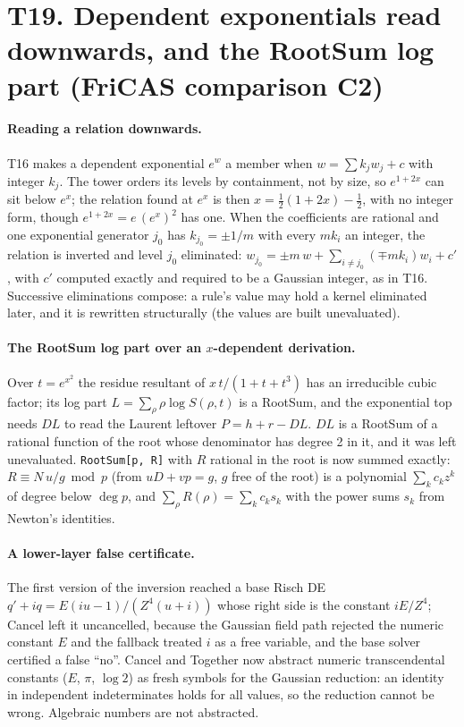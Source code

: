\documentclass[11pt]{article}
\theoremstyle{definition}
\theoremstyle{remark}
\newcommand{\code}[1]{\texttt{#1}}
\begin{document}
\section*{T19. Dependent exponentials read downwards, and the RootSum log part (FriCAS comparison C2)}
\label{sec:T19}

\paragraph{Reading a relation downwards.} T16 makes a dependent exponential $e^{w}$ a member when
$w=\sum k_jw_j+c$ with integer $k_j$. The tower orders its levels by containment, not by
size, so $e^{1+2x}$ can sit below $e^{x}$; the relation found at $e^x$ is then
$x=\frac12(1+2x)-\frac12$, with no integer form, though $e^{1+2x}=e\,(e^x)^2$ has one. When
the coefficients are rational and one exponential generator $j_0$ has $k_{j_0}=\pm1/m$ with
every $mk_i$ an integer, the relation is inverted and level $j_0$ eliminated:
$w_{j_0}=\pm m\,w+\sum_{i\ne j_0}(\mp mk_i)w_i+c'$, with $c'$ computed exactly and required to
be a Gaussian integer, as in T16. Successive eliminations compose: a rule's value may hold a
kernel eliminated later, and it is rewritten structurally (the values are built unevaluated).

\paragraph{The RootSum log part over an $x$-dependent derivation.} Over $t=e^{x^2}$ the residue
resultant of $x\,t/(1+t+t^3)$ has an irreducible cubic factor; its log part
$L=\sum_{\rho}\rho\log S(\rho,t)$ is a RootSum, and the exponential top needs $D L$ to read the
Laurent leftover $P=h+r-DL$. $DL$ is a RootSum of a rational function of the root whose
denominator has degree 2 in it, and it was left unevaluated. \code{RootSum[p, R]} with $R$
rational in the root is now summed exactly: $R\equiv N\,u/g \bmod p$ (from $uD+vp=g$, $g$ free
of the root) is a polynomial $\sum_k c_kz^k$ of degree below $\deg p$, and
$\sum_\rho R(\rho)=\sum_k c_ks_k$ with the power sums $s_k$ from Newton's identities.

\paragraph{A lower-layer false certificate.} The first version of the inversion reached a base
Risch DE $q'+iq=E(iu-1)/(Z^4(u+i))$ whose right side is the constant $iE/Z^4$; Cancel left it
uncancelled, because the Gaussian field path rejected the numeric constant $E$ and the fallback
treated $i$ as a free variable, and the base solver certified a false ``no''. Cancel and
Together now abstract numeric transcendental constants ($E$, $\pi$, $\log 2$) as fresh symbols
for the Gaussian reduction: an identity in independent indeterminates holds for all values, so
the reduction cannot be wrong. Algebraic numbers are not abstracted.
\end{document}
